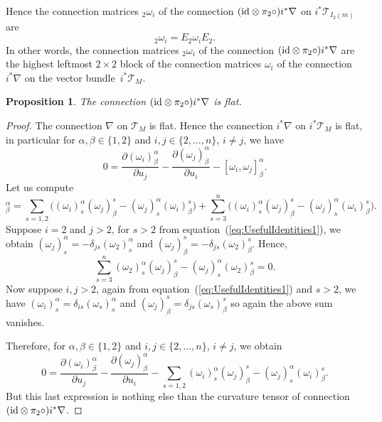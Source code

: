 \documentclass[pdftex]{sigma}
\numberwithin{equation}{section}
\newtheorem{Proposition}[Theorem]{Proposition}
 { \theoremstyle{definition}
\newtheorem{Definition}[Theorem]{Definition}
\newtheorem{Note}[Theorem]{Note}
\newtheorem{Example}[Theorem]{Example}
\newtheorem{Remark}[Theorem]{Remark} }
\begin{document}
 Hence the connection matrices $_{2}\omega_{i}$ of the connection $({\rm id}\otimes\pi_{2}\circ)i^{*}\nabla$ on $i^{*}\mathcal{T}_{I_{2}(m)}$ are
 \begin{equation*}
 _{2}\omega_{i}=E_{2}\omega_{i}E_{2}.
 \end{equation*}
 In other words, the connection matrices $_{2}\omega_{i}$ of the connection $({\rm id}\otimes\pi_{2}\circ)i^{*}\nabla$ are the highest leftmost $2\times 2$ block of the connection matrices $\omega_{i}$ of the connection $i^{*}\nabla$ on the vector bundle~$i^{*}\mathcal{T}_{M}$.
 \begin{Proposition}
 \label{prop:FlatnessDiagonalConnection}
 The connection $({\rm id}\otimes\pi_{2}\circ)i^{*}\nabla$ is flat.
 \end{Proposition}
 \begin{proof}
 The connection $\nabla$ on $\mathcal{T}_{M}$ is flat. Hence the connection $i^{*}\nabla$ on $i^{*}\mathcal{T}_{M}$ is flat, in particular for $\alpha,\beta\in\{ 1,2 \}$ and $i,j\in\{ 2,\dots,n \}$, $i\neq j$, we have
 \begin{equation*}
 0=\frac{\partial (\omega_{i})^{\alpha}_{\beta}}{\partial u_{j}}-\frac{\partial (\omega_{j})^{\alpha}_{\beta}}{\partial u_{i}}-[\omega_{i},\omega_{j}]^{\alpha}_{\beta}.
 \end{equation*}
 Let us compute
 \begin{equation*}
 [\omega_{i},\omega_{j}]^{\alpha}_{\beta}=\sum_{s=1,2}\bigl((\omega_{i})^{\alpha}_{s}(\omega_{j})^{s}_{\beta}-(\omega_{j})^{\alpha}_{s}(\omega_{i})^{s}_{\beta}\bigr)
 +\sum_{s=3}^{n}\bigl((\omega_{i})^{\alpha}_{s}(\omega_{j})^{s}_{\beta}-(\omega_{j})^{\alpha}_{s}(\omega_{i})^{s}_{\beta}\bigr).
 \end{equation*}
 Suppose $i=2$ and $j>2$, for $s>2$ from equation~(\ref{eq:UsefulIdentities1}), we obtain $(\omega_{j})^{\alpha}_{s}=-\delta_{js}(\omega_{2})^{\alpha}_{s}$ and $(\omega_{j})^{s}_{\beta}=-\delta_{js}(\omega_{2})^{s}_{\beta}$. Hence,
 \begin{equation*}
 \sum_{s=3}^{n}(\omega_{2})^{\alpha}_{s}(\omega_{j})^{s}_{\beta}-(\omega_{j})^{\alpha}_{s}(\omega_{2})^{s}_{\beta}=0.
 \end{equation*}
 Now suppose $i,j>2$, again from equation~(\ref{eq:UsefulIdentities1}) and $s>2$, we have $(\omega_{i})^{\alpha}_{s}=\delta_{is}(\omega_{s})^{\alpha}_{s}$ and $(\omega_{j})^{s}_{\beta}=\delta_{js}(\omega_{s})^{s}_{\beta}$ so again the above sum vanishes.

 Therefore, for $\alpha,\beta\in\{ 1,2 \}$ and $i,j\in\{ 2,\dots,n \}$, $i\neq j$, we obtain
 \begin{equation*}
 0=\frac{\partial (\omega_{i})^{\alpha}_{\beta}}{\partial u_{j}}-\frac{\partial (\omega_{j})^{\alpha}_{\beta}}{\partial u_{i}}-\sum_{s=1,2}(\omega_{i})^{\alpha}_{s}(\omega_{j})^{s}_{\beta}-(\omega_{j})^{\alpha}_{s}(\omega_{i})^{s}_{\beta}.
 \end{equation*}
 But this last expression is nothing else than the curvature tensor of connection $({\rm id}\otimes\pi_{2}\circ)i^{*}\nabla$.
 \end{proof}
\end{document}
